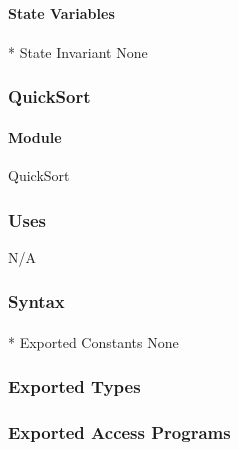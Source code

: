 \documentclass[12pt]{article}
\begin{document}
                \paragraph* {State Variables} 
                
                \paragraph{}* {State Invariant}
                None
                 \newpage
                \subsubsection* {QuickSort}
                
                \paragraph*{Module}
                
                QuickSort
                
                \subsubsection* {Uses}
                N/A
                
                \subsubsection* {Syntax}

                \paragraph{}* {Exported Constants}
                None
                
                \subsubsection* {Exported Types}

                \subsubsection* {Exported Access Programs}
                
\end{document}
